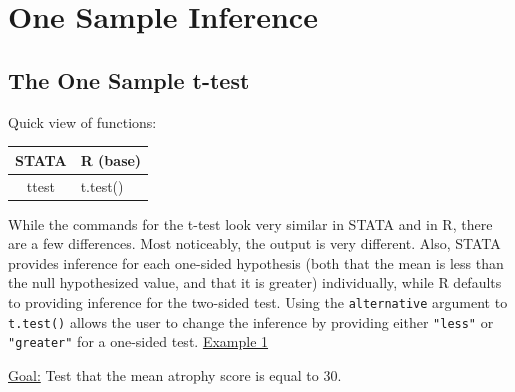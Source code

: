 \documentclass[landscape]{article}
\begin{document}
\section{One Sample Inference}
\subsection{The One Sample t-test}
Quick view of functions:\\
\begin{tabular}{c|l}
STATA & R (base) \\
\hline
ttest & t.test()
\end{tabular}

While the commands for the t-test look very similar in STATA and in R, there are a few differences. Most noticeably, the output is very different. Also, STATA provides inference for each one-sided hypothesis (both that the mean is less than the null hypothesized value, and that it is greater) individually, while R defaults to providing inference for the two-sided test. Using the \texttt{alternative} argument to \texttt{t.test()} allows the user to change the inference by providing either \texttt{"less"} or \texttt{"greater"} for a one-sided test.
\newline
\noindent \underline{Example 1}

\underline{Goal:} Test that the mean atrophy score is equal to 30.
\end{document}
